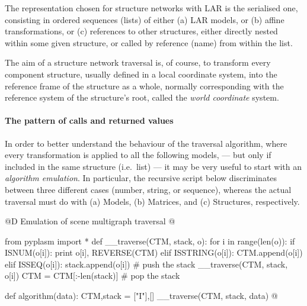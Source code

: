 \documentclass[11pt,oneside]{article}    %
\begin{document}
The representation chosen for structure networks with LAR is the serialised one, consisting in ordered sequences (lists) of either (a) LAR models, or (b) affine transformations, or (c) references to other structures, either directly nested within some given structure, or called by reference (name) from within the list.

The aim of a structure network traversal is, of course, to transform every component structure, usually defined in a local coordinate system, into the reference frame of the structure as a whole, normally corresponding with the reference system of the structure's root, called the \emph{world coordinate} system.

\paragraph{The pattern of calls and returned values}

In order to better understand the behaviour of the traversal algorithm, where every transformation is applied to all the following models, --- but only if included in the same structure  (i.e.~list) --- it may be very useful to start with an \emph{algorithm emulation}. In particular, the recursive script below discriminates between three different cases (number, string, or sequence), whereas the actual traversal must do with (a) Models, (b) Matrices, and (c) Structures, respectively.

@D Emulation of scene multigraph traversal
@{from pyplasm import *
def __traverse(CTM, stack, o):
    for i in range(len(o)):
        if ISNUM(o[i]): print o[i], REVERSE(CTM)
        elif ISSTRING(o[i]): 
            CTM.append(o[i])
        elif ISSEQ(o[i]):
            stack.append(o[i])                # push the stack
            __traverse(CTM, stack, o[i])
            CTM = CTM[:-len(stack)]         # pop the stack

def algorithm(data):
    CTM,stack = ["I"],[]
    __traverse(CTM, stack, data)  
@}
\end{document}
